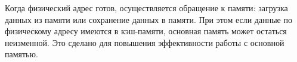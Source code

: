 Когда физический адрес готов, осуществляется обращение к памяти:
загрузка данных из памяти или сохранение данных в памяти. При этом
если данные по физическому адресу имеются в кэш-памяти, основная
память может остаться неизменной. Это сделано для повышения
эффективности работы с основной памятью.



